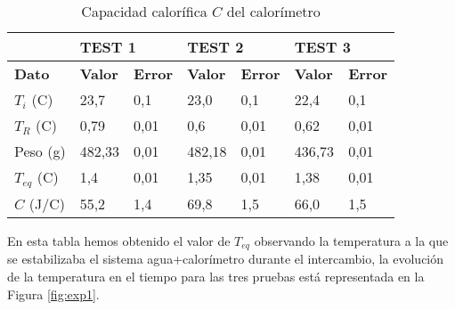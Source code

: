 \documentclass[a4paper,12pt,spanish]{article}
\begin{document}
\begin{table}[h!]
	\centering
	\begin{tabular}{l|ll|lll|lll|}
		\cline{2-9}
		\textbf{}                               & \multicolumn{2}{l|}{\textbf{TEST 1}}                 & \multicolumn{3}{l|}{\textbf{TEST 2}}                      & \multicolumn{3}{l|}{\textbf{TEST 3}}                      \\ \hline
		\multicolumn{1}{|l|}{\textbf{Dato}}     & \multicolumn{1}{l|}{\textbf{Valor}} & \textbf{Error} & \multicolumn{2}{l|}{\textbf{Valor}} & \textbf{Error}      & \multicolumn{2}{l|}{\textbf{Valor}} & \textbf{Error}      \\ \hline\hline
		\multicolumn{1}{|l|}{$T_i$ (C)}    & \multicolumn{1}{l|}{23,7}           & 0,1           & \multicolumn{2}{l|}{23,0}             & 0,1                & \multicolumn{2}{l|}{22,4}           & 0,1                \\ \hline
		\multicolumn{1}{|l|}{$T_R$ (C)}    & \multicolumn{1}{l|}{0,79}           & 0,01           & \multicolumn{2}{l|}{0,6}            & 0,01                & \multicolumn{2}{l|}{0,62}           & 0,01                \\ \hline
		\multicolumn{1}{|l|}{Peso (g)}     & \multicolumn{1}{l|}{482,33}         & 0,01           & \multicolumn{2}{l|}{482,18}         & 0,01                & \multicolumn{2}{l|}{436,73}         & 0,01                \\ \hline
		\multicolumn{1}{|l|}{$T_{eq}$ (C)} & \multicolumn{1}{l|}{1,4}            & 0,01           & \multicolumn{2}{l|}{1,35}           & 0,01                & \multicolumn{2}{l|}{1,38}           & 0,01                \\ \hline\hline
		\multicolumn{1}{|l|}{$C$ (J/C)}      & \multicolumn{1}{l|}{55,2}           & 1,4            & \multicolumn{2}{l|}{69,8}           & 1,5                 & \multicolumn{2}{l|}{66,0}           & 1,5                 \\ \hline
	\end{tabular}
	\caption{Capacidad calorífica $C$ del calorímetro}
\end{table}
	
	
	En esta tabla hemos obtenido el valor de $T_{eq}$ observando la temperatura a la que se estabilizaba el sistema agua+calorímetro durante el intercambio, la evolución de la temperatura en el tiempo para las tres pruebas está representada en la Figura \ref{fig:exp1}.
	
\end{document}
